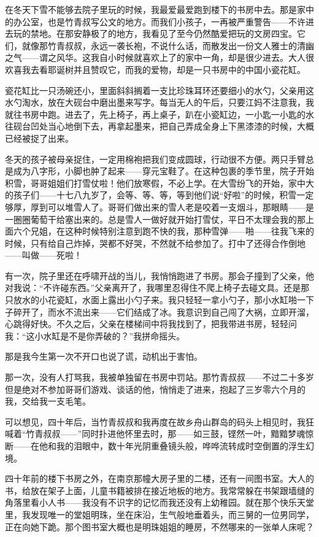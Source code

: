 \par 在冬天下雪不能够去院子里玩的时候，我最爱最爱跑到楼下的书房中去。那是家中的办公室，也是竹青叔写公文的地方。而我们小孩子，一再被严重警告——不许进去玩的禁地。在那安静极了的地方，我看见了至今仍然酷爱把玩的文房四宝。它们，就像那竹青叔叔，永远一袭长袍，不说什么话，而散发出一份文人雅士的清幽之气——谓之风华。这我自小时候就喜欢上了的家中一角，却是很少进去。大人很欢喜我去看耶诞树并且赞叹它，而我的爱物，却是一只书房中的中国小瓷花缸。
\par 瓷花缸比一只汤碗还小，里面斜斜搁着一支比珍珠耳环还要细小的水勺，父亲用这水勺淘水，放在大砚台中磨出墨来写字。每当无人的午后，只要江妈不注意我，我就往书房中跑。进去了，先上椅子，再上桌子，趴在小瓷缸边，一小匙一小匙的水往砚台凹处当心地倒下去，再拿起墨来，把自己弄成全身上下黑漆漆的时候，大概已经被捉了出来。
\par 冬天的孩子被母亲捉住，一定用棉袍把我们变成圆球，行动很不方便。两只手臂总是成为八字形，小脚也肿了起来——穿元宝鞋了。在这种包裹的季节里，院子开始积雪，哥哥姐姐们打雪仗啦！他们放寒假，不必上学。在大雪纷飞的开始，家中大的孩子们——十七八九岁了，会等、等、等，等到他们说“好啦”的时候，积雪一定够厚，厚到可以堆雪人了。哥哥们做出来的雪人老是咬着一支烟斗，那眼睛——是一圈圈葡萄干给塞出来的。总是雪人一做好就开始打雪仗，平日不太理会我的那上面六个兄姐，在这种时候特别注意到跑不快的我，那种雪弹——啪——往我飞来的时候，只有给自己炸掉，哭都不好哭，不然就不给参加了。打中了还得合作倒地——叫做——死啦！
\par 有一次，院子里还在呼啸开战的当儿，我悄悄跑进了书房。那会子撞到了父亲，他对我说：“不许碰东西。”父亲离开了，我哪里忍得住不爬上椅子去碰文具。还是那只放水的小花瓷缸，水面上露出小勺子来。我只轻轻一拿小勺子，那小水缸啪一下子碎开了，而水不流出来——它们结成了冰。我意识到自己闯了大祸，立即开溜，心跳得好快。不久之后，父亲在楼梯间中将我找到了，把我带进书房，轻轻问我：“这小水缸是不是你弄破的？”我拼命摇头。
\par 那是我今生第一次不开口也说了谎，动机出于害怕。
\par 那一次，没有人打骂我，我被单独留在书房中罚站。那竹青叔叔——不过二十多岁但是绝对不参加哥哥们游戏、谈话的他，悄悄走了进来，抱起了三岁零六个月的我，交给我一支毛笔。
\par 可以想见，四十年后，当竹青叔叔和我再度在故乡舟山群岛的码头上相见时，我狂喊着“竹青叔叔——”同时扑进他怀里去时，那——如三鼓，铿然一叶，黯黯梦魂惊断——在他和我的泪眼中，数十年光阴重叠镜头般，哗哗流转成时空倒置的浮生幻境。
\par 四十年前的楼下书房之外，在南京那幢大房子里的二楼，还有一间图书室。大人的书，给放在架子上面，儿童书籍被排在接近地板的地方。我常常躲在书架跟墙缝的角落里看小人书——我没有不识字的记忆而我还没有上幼稚园。就在那个快乐天堂里，我发现唯一的堂姐明珠，坐在床沿，生气般地垂着头，而三舅的一位男同学，正在向她下跪。那个图书室大概也是明珠姐姐的睡房，不然哪来的一张单人床呢？
